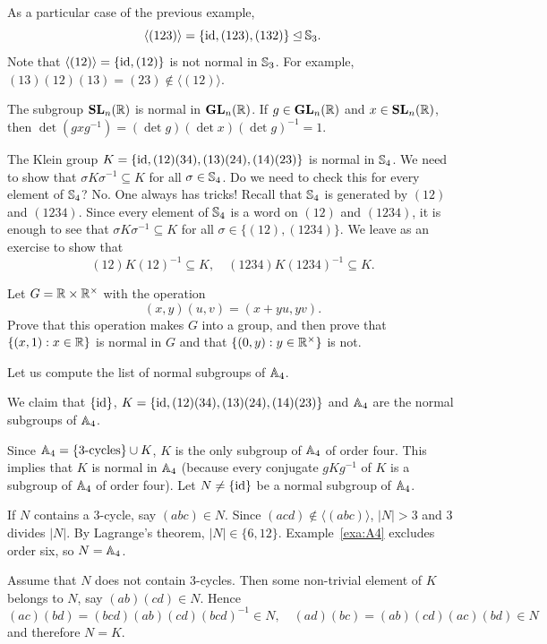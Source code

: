 \begin{example}
As a particular case of the previous example, 
\[
\langle (123)\rangle=\{\operatorname{id},(123),(132)\}\unlhd\mathbb{S}_3.
\]
Note that
$\langle (12)\rangle=\{\operatorname{id},(12)\}$ is not normal in $\mathbb{S}_3$.  
For example, $(13)(12)(13)=(23)\not\in\langle(12)\rangle$.
\end{example}

\begin{example}
  The subgroup $\mathbf{SL}_n(\mathbb{R})$ is normal in $\mathbf{GL}_n(\mathbb{R})$. If $g\in\mathbf{GL}_n(\mathbb{R})$ and $x\in\mathbf{SL}_n(\mathbb{R})$, then $\det(gxg^{-1})=(\det g)(\det x)(\det g)^{-1}=1$.
\end{example}

\begin{example}
The Klein group $K=\{\operatorname{id},(12)(34),(13)(24),(14)(23)\}$ is normal in
$\mathbb{S}_4$. We need to show that 
$\sigma K\sigma^{-1}\subseteq K$ for all $\sigma\in\mathbb{S}_4$. Do we need to check this for every element of $\mathbb{S}_4$? No. One always has tricks! 
Recall that $\mathbb{S}_4$ is generated by $(12)$ and $(1234)$. Since
every element of  $\mathbb{S}_4$ is a word on $(12)$ and 
$(1234)$,
it is enough to see that
$\sigma K\sigma^{-1}\subseteq K$ for all $\sigma\in\{(12),(1234)\}$. We leave as an exercise to show that 
\[
(12)K(12)^{-1}\subseteq K,\quad
(1234)K(1234)^{-1}\subseteq K.
\]
\end{example}

\begin{exercise}
Let $G=\mathbb{R}\times\mathbb{R}^\times$ with the operation 
\[
(x,y)(u,v)=(x+yu,yv).
\]
Prove that this operation makes $G$ into a group, and then prove  
that $\{(x,1):x\in\mathbb{R}\}$ is normal in $G$ and that
$\{(0,y):y\in\mathbb{R}^\times\}$ is not. 
\end{exercise}

Let us compute the list of normal subgroups of $\mathbb{A}_4$.

\begin{example}
\label{exa:normal_A4}
We claim that 
$\{\operatorname{id}\}$, $K=\{\operatorname{id},(12)(34),(13)(24),(14)(23)\}$ and $\mathbb{A}_4$ 
are the normal subgroups of $\mathbb{A}_4$.

Since $\mathbb{A}_4=\{\text{3-cycles}\}\cup K$, $K$ is the only subgroup
of $\mathbb{A}_4$ of order four. This implies that $K$ is normal in $\mathbb{A}_4$ (because every conjugate $gKg^{-1}$ of $K$ is a subgroup of 
$\mathbb{A}_4$ of order four). Let $N\ne\{\operatorname{id}\}$ be a normal subgroup of 
$\mathbb{A}_4$. 

If $N$ contains a 3-cycle, say 
$(abc)\in N$. 
Since $(acd)\notin\langle(abc)\rangle$, 
$|N|>3$ and 3 divides $|N|$. By Lagrange's theorem,
$|N|\in\{6,12\}$. Example~\ref{exa:A4} excludes
order six, so $N=\mathbb{A}_4$.

Assume that $N$ does not contain 3-cycles. 
Then some non-trivial element of $K$ belongs to $N$, say 
$(ab)(cd)\in N$. Hence 
\[
(ac)(bd)=(bcd)(ab)(cd)(bcd)^{-1}\in N,\quad
(ad)(bc)=(ab)(cd)(ac)(bd)\in N
\]
and therefore $N=K$.
\end{example}

